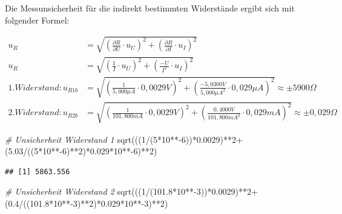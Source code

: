 \documentclass[
  9pt,
]{article}
\newenvironment{Shaded}{\begin{snugshade}}{\end{snugshade}}
\newcommand{\CommentTok}[1]{\textcolor[rgb]{0.56,0.35,0.01}{\textit{#1}}}
\newcommand{\DecValTok}[1]{\textcolor[rgb]{0.00,0.00,0.81}{#1}}
\newcommand{\FloatTok}[1]{\textcolor[rgb]{0.00,0.00,0.81}{#1}}
\newcommand{\FunctionTok}[1]{\textcolor[rgb]{0.00,0.00,0.00}{#1}}
\newcommand{\NormalTok}[1]{#1}
\newcommand{\SpecialCharTok}[1]{\textcolor[rgb]{0.00,0.00,0.00}{#1}}
\begin{document}
Die Messunsicherheit für die indirekt bestimmten Widerstände ergibt sich
mit folgender Formel:

\begin {equation*}
\begin{split}
u_R &= \sqrt{\left (\frac{\partial R}{\partial U} \cdot u_U\right )^2 + \left (\frac{\partial R}{\partial I} \cdot u_I\right )^2 } \\
u_R &= \sqrt{\left (\frac{1}{I} \cdot u_U\right )^2 + \left (\frac{-U}{I^2} \cdot u_I\right )^2 } \\
1.Widerstand: u_{R1b}&= \sqrt{\left (\frac{1}{5,000\mu A} \cdot 0,0029V\right )^2 + \left (\frac{-5,0300V}{5,000\mu A^2} \cdot 0,029 \mu A\right )^2 } \approx \pm 5900\Omega \\
2.Widerstand: u_{R2b}&= \sqrt{\left (\frac{1}{101,800mA} \cdot 0,0029V \right )^2 + \left (\frac{0,4000V}{101,800mA^2} \cdot 0,029mA\right )^2 } \approx \pm 0,029\Omega
\end{split}
\end{equation*}

\begin{Shaded}
\begin{Highlighting}[]
\CommentTok{\# Unsicherheit Widerstand 1}
\FunctionTok{sqrt}\NormalTok{(((}\DecValTok{1}\SpecialCharTok{/}\NormalTok{(}\DecValTok{5}\SpecialCharTok{*}\DecValTok{10}\SpecialCharTok{**{-}}\DecValTok{6}\NormalTok{))}\SpecialCharTok{*}\FloatTok{0.0029}\NormalTok{)}\SpecialCharTok{**}\DecValTok{2}\SpecialCharTok{+}\NormalTok{(}\FloatTok{5.03}\SpecialCharTok{/}\NormalTok{((}\DecValTok{5}\SpecialCharTok{*}\DecValTok{10}\SpecialCharTok{**{-}}\DecValTok{6}\NormalTok{)}\SpecialCharTok{**}\DecValTok{2}\NormalTok{)}\SpecialCharTok{*}\FloatTok{0.029}\SpecialCharTok{*}\DecValTok{10}\SpecialCharTok{**{-}}\DecValTok{6}\NormalTok{)}\SpecialCharTok{**}\DecValTok{2}\NormalTok{)}
\end{Highlighting}
\end{Shaded}

\begin{verbatim}
## [1] 5863.556
\end{verbatim}

\begin{Shaded}
\begin{Highlighting}[]
\CommentTok{\# Unsicherheit Widerstand 2}
\FunctionTok{sqrt}\NormalTok{(((}\DecValTok{1}\SpecialCharTok{/}\NormalTok{(}\FloatTok{101.8}\SpecialCharTok{*}\DecValTok{10}\SpecialCharTok{**{-}}\DecValTok{3}\NormalTok{))}\SpecialCharTok{*}\FloatTok{0.0029}\NormalTok{)}\SpecialCharTok{**}\DecValTok{2}\SpecialCharTok{+}\NormalTok{(}\FloatTok{0.4}\SpecialCharTok{/}\NormalTok{((}\FloatTok{101.8}\SpecialCharTok{*}\DecValTok{10}\SpecialCharTok{**{-}}\DecValTok{3}\NormalTok{)}\SpecialCharTok{**}\DecValTok{2}\NormalTok{)}\SpecialCharTok{*}\FloatTok{0.029}\SpecialCharTok{*}\DecValTok{10}\SpecialCharTok{**{-}}\DecValTok{3}\NormalTok{)}\SpecialCharTok{**}\DecValTok{2}\NormalTok{)}
\end{Highlighting}
\end{Shaded}
\end{document}
